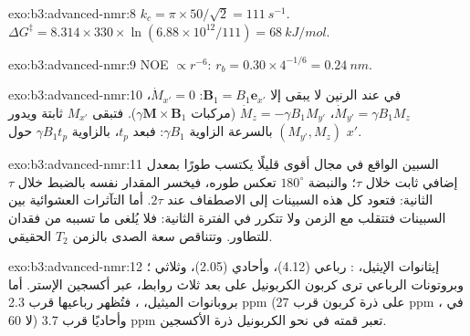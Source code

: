 \begin{solution}{exo:b3:advanced-nmr:8}
$k_c = \pi \times 50/\sqrt2 = \qty{111}{s^{-1}}$. $\Delta G^\ddagger = 8.314 \times 330 \times
\ln(6.88\times10^{12}/111) = \qty{68}{kJ/mol}$.
\end{solution}

\begin{solution}{exo:b3:advanced-nmr:9}
NOE $\propto r^{-6}$: $r_b = 0.30 \times 4^{-1/6} = \qty{0.24}{nm}$.
\end{solution}

\begin{solution}{exo:b3:advanced-nmr:10}
في  عند الرنين لا يبقى إلا $\mathbf B_1 = B_1\mathbf e_{x'}$:
$\dot M_{x'} = 0$، $\dot M_{y'} = \gamma B_1M_z$، $\dot M_z = -\gamma B_1M_{y'}$ (مركبات
$\gamma\mathbf M\times\mathbf B_1$). فتبقى $M_{x'}$ ثابتة ويدور $(M_{y'}, M_z)$ بالسرعة الزاوية
$\gamma B_1$: فبعد $t_p$، بالزاوية $\gamma B_1t_p$ حول $x'$.
\end{solution}

\begin{solution}{exo:b3:advanced-nmr:11}
السبين الواقع في مجال أقوى قليلًا يكتسب طورًا بمعدل إضافي ثابت خلال
$\tau$؛ والنبضة $180^\circ$ تعكس طوره، فيخسر المقدار نفسه بالضبط
خلال $\tau$ الثانية: فتعود كل هذه السبينات إلى الاصطفاف عند $2\tau$. أما التآثرات
العشوائية بين السبينات فتتقلب مع الزمن ولا تتكرر في الفترة الثانية: فلا
يُلغى ما تسببه من فقدان للتطاور. وتتناقص سعة الصدى بالزمن $T_2$ الحقيقي.
\end{solution}

\begin{solution}{exo:b3:advanced-nmr:12}
إيثانوات الإيثيل، : رباعي  (4.12)، وأحادي  (2.05)،
وثلاثي ؛ وبروتونات الرباعي ترى كربون الكربونيل على بعد ثلاث روابط،
عبر أكسجين الإستر. أما بروبانوات الميثيل، ، فتُظهر
رباعيها قرب 2.3 ppm (على ذرة كربون قرب 27 ppm في ، لا 60) وأحاديًا
 قرب 3.7 ppm تعبر قمته في  نحو الكربونيل ذرة الأكسجين.
\end{solution}

